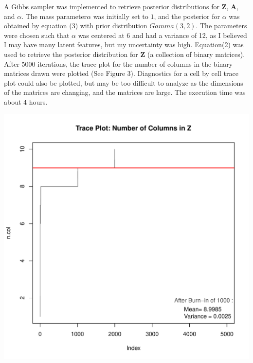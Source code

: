 \noindent
A Gibbs sampler was implemented to retrieve posterior distributions for $\bm
Z$, $\bm A$, and $\alpha$. The mass parameter$\alpha$ was initially set to $1$,
and the posterior for $\alpha$ was obtained by equation (3) with prior
distribution $Gamma(3,2)$.  The parameters were chosen such that $\alpha$ was
centered at 6 and had a variance of 12, as I believed I may have many latent
features, but my uncertainty was high.  Equation(2) was used to retrieve the
posterior distribution for $\bm Z$ (a collection of binary matrices). After
5000 iterations, the trace plot for the number of columns in the binary
matrices drawn were plotted (See Figure 3). Diagnostics for a cell by cell
trace plot could also be plotted, but may be too difficult to analyze as the
dimensions of the matrices are changing, and the matrices are large. The
execution time was about 4 hours.
\beginmyfig
  \caption{}
  \includegraphics{images/traceplot.pdf}
  \vspace{-15mm}
\endmyfig
\beginmyfig
  \caption{}
